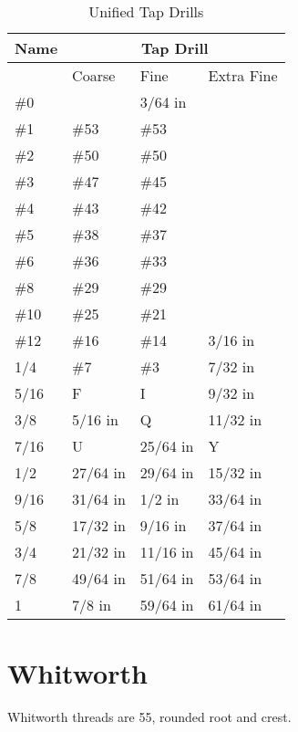 \begin{table}[h!]
    \footnotesize
\begin{longtable}{l|lll}
	Name
    &\multicolumn{3}{c}{Tap Drill}
    \\
\hline
    &Coarse
    &Fine
    &Extra Fine
    \\
\hline

\#0 &&3/64 in &\\
\#1 &\#53 &\#53 &\\
\#2 &\#50 &\#50 &\\
\#3 &\#47 &\#45 &\\
\#4 &\#43 &\#42 &\\
\#5 &\#38 &\#37 &\\
\#6 &\#36 &\#33 &\\
\#8 &\#29 &\#29 &\\
\#10 &\#25 &\#21 &\\
\#12 &\#16 &\#14 &3/16 in\\
1/4 &\#7 &\#3 &7/32 in\\
5/16 &F &I &9/32 in\\
3/8 &5/16 in &Q &11/32 in\\
7/16 &U &25/64 in &Y\\
1/2 &27/64 in &29/64 in &15/32 in\\
9/16 &31/64 in &1/2 in &33/64 in\\
5/8 &17/32 in &9/16 in &37/64 in\\
3/4 &21/32 in &11/16 in &45/64 in\\
7/8 &49/64 in &51/64 in &53/64 in\\
1 &7/8 in &59/64 in &61/64 in\\
\end{longtable}
\caption{Unified Tap Drills}
\end{table}




\clearpage
\section{Whitworth}
Whitworth threads are 55\degree, rounded root and crest.
\\ \\ \\ \\ \\ \\ \\ \\ \\ \\ \\ \\ \\ \\ \\ \\ \\ \\               
